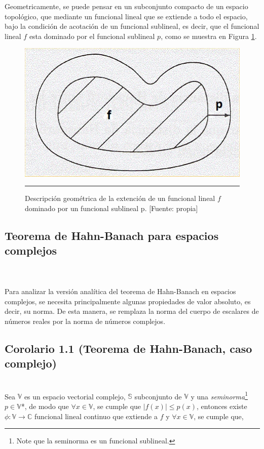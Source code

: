 \documentclass[10pt]{amsart}
\theoremstyle{remark}
\numberwithin{equation}{section}
\begin{document}
Geometricamente, se puede pensar en un subconjunto compacto de un espacio topológico, que mediante un funcional lineal que se extiende a todo el espacio, bajo la condición de acotación de un funcional sublineal, es decir, que el funcional lineal $f$ esta dominado por el funcional sublineal $p$, como se muestra en Figura \ref{03}.\\
\begin{figure}[h]
\centering \includegraphics[scale=0.92]{Pic/Esquema05.jpg}
\caption{Descripción geométrica de la extención de un funcional lineal $f$ dominado por un funcional sublineal p. [Fuente: propia]}\label{03}	
\hrule
\end{figure} \vspace*{1cm}	


\subsection*{Teorema de Hahn-Banach para espacios complejos}
\ \\ \\
Para analizar la versión analítica del teorema de Hahn-Banach en espacios complejos, se necesita principalmente algunas propiedades de valor absoluto, es decir, su norma. De esta manera, se remplaza la norma del cuerpo de escalares de números reales por la norma de números complejos.\\ 

\subsection*{Corolario 1.1 (Teorema de Hahn-Banach, caso complejo)} \ \\ Sea $\mathbb{V}$ es un espacio vectorial complejo, $\mathbb{S}$ subconjunto de $\mathbb{V}$ y una \textit{seminorma}\footnote{Note que la seminorma es un funcional sublineal.} $p \in \mathbb{V}$*, de modo que $ \forall x \in \mathbb{V} $, se cumple que $ \left \vert f(x) \right \vert \leq p(x) $,  entonces existe $\phi: \mathbb{V} \to \mathbb{C}$ funcional lineal continuo que extiende a $f$ y $\forall x \in \mathbb{V}$, se cumple que,
\end{document}
